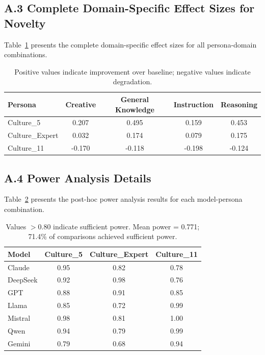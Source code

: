 \documentclass{article}
\begin{document}
\newpage
\subsection*{A.3 Complete Domain-Specific Effect Sizes for Novelty}

Table~\ref{tab:domain_novelty_full} presents the complete domain-specific effect sizes for all persona-domain combinations.

\begin{table}[H]
\centering
\caption{Complete Domain-Specific Effect Sizes for Novelty}
\label{tab:domain_novelty_full}
\begin{tabular}{lcccc}
\toprule
\textbf{Persona} & \textbf{Creative} & \textbf{General Knowledge} & \textbf{Instruction} & \textbf{Reasoning} \\
\midrule
Culture\_5 & 0.207 & 0.495 & 0.159 & 0.453 \\
Culture\_Expert & 0.032 & 0.174 & 0.079 & 0.175 \\
Culture\_11 & -0.170 & -0.118 & -0.198 & -0.124 \\
\bottomrule
\end{tabular}
\caption*{\footnotesize Positive values indicate improvement over baseline; negative values indicate degradation.}
\end{table}

\newpage
\subsection*{A.4 Power Analysis Details}

Table~\ref{tab:power_novelty_full} presents the post-hoc power analysis results for each model-persona combination.

\begin{table}[H]
\centering
\caption{Post-hoc Power Analysis for Novelty by Model and Persona}
\label{tab:power_novelty_full}
\begin{tabular}{lccc}
\toprule
Model & Culture\_5 & Culture\_Expert & Culture\_11 \\
\midrule
Claude & 0.95 & 0.82 & 0.78 \\
DeepSeek & 0.92 & 0.98 & 0.76 \\
GPT & 0.88 & 0.91 & 0.85 \\
Llama & 0.85 & 0.72 & 0.99 \\
Mistral & 0.98 & 0.81 & 1.00 \\
Qwen & 0.94 & 0.79 & 0.99 \\
Gemini & 0.79 & 0.68 & 0.94 \\
\bottomrule
\end{tabular}
\caption*{\footnotesize Values $>0.80$ indicate sufficient power. Mean power = 0.771; 71.4\% of comparisons achieved sufficient power.}
\end{table}
\end{document}
